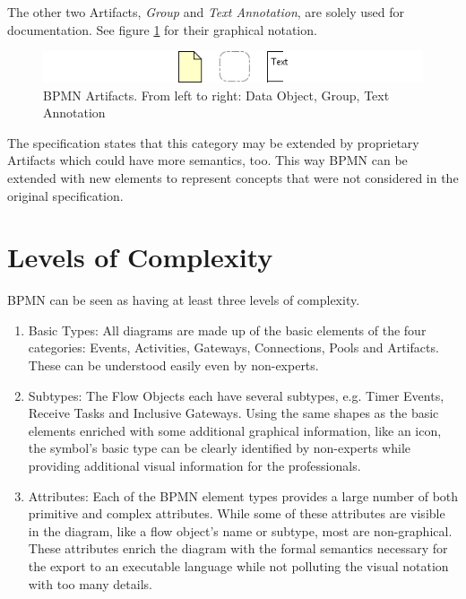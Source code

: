 The other two Artifacts, \emph{Group} and \emph{Text Annotation}, are solely used
for documentation.  See figure \ref{fig:artifacts} for their graphical notation.

\begin{figure}[ht]
	\centering
	\includegraphics[width=.75\textwidth]{figures/bpmn/artifacts.png}
	\caption[BPMN Artifacts]{BPMN Artifacts.  From left to right: Data Object,
	Group, Text Annotation}
	\label{fig:artifacts}
\end{figure}

The specification states that this category may be extended by proprietary
Artifacts which could have more semantics, too.  This way BPMN can be extended
with new elements to represent concepts that were not considered in the original
specification.



\section{Levels of Complexity}
\label{sec:bpmn_complexity}

BPMN can be seen as having at least three levels of complexity.

\begin{enumerate}
	\item Basic Types: All diagrams are made up of the basic elements of the four
	categories: Events, Activities, Gateways, Connections, Pools and Artifacts.
	These can be understood easily even by non-experts.

	\item Subtypes: The Flow Objects each have several subtypes, e.g.  Timer
	Events, Receive Tasks and Inclusive Gateways.  Using the same shapes as the
	basic elements enriched with some additional graphical information, like an
	icon, the symbol's basic type can be clearly identified by non-experts while
	providing additional visual information for the professionals.

	\item Attributes: Each of the BPMN element types provides a large number of
	both primitive and complex attributes.  While some of these attributes are
	visible in the diagram, like a flow object's name or subtype, most are
	non-graphical.  These attributes enrich the diagram with the formal semantics
	necessary for the export to an executable language while not polluting the
	visual notation with too many details.
\end{enumerate}

